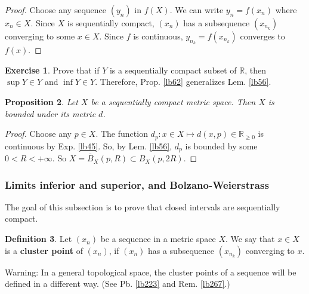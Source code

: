 \documentclass[12pt,b5paper,notitlepage]{article}
\theoremstyle{definition}
\newtheorem{df}{Definition}[section]
\newtheorem{exe}[df]{Exercise}
\theoremstyle{plain}
\newtheorem{pp}[df]{Proposition}
\newcommand{\ovl}{\overline}
\newcommand{\Rbb}{\mathbb R}
\numberwithin{equation}{section}
\begin{document}
\begin{proof}
Choose any sequence $(y_n)$ in $f(X)$. We can write $y_n=f(x_n)$ where $x_n\in X$. Since $X$ is sequentially compact, $(x_n)$ has a subsequence $(x_{n_k})$ converging to some $x\in X$. Since $f$ is continuous, $y_{n_k}=f(x_{n_k})$ converges to $f(x)$.
\end{proof}


\begin{exe}\label{lb63}
Prove that if $Y$ is a sequentially compact subset of $\Rbb$, then $\sup Y\in Y$ and $\inf Y\in Y$. Therefore, Prop. \ref{lb62} generalizes Lem. \ref{lb56}.
\end{exe}

\begin{pp}\label{lb71}
Let $X$ be a sequentially compact metric space. Then $X$ is bounded under its metric $d$.
\end{pp}

\begin{proof}
Choose any $p\in X$. The function $d_p:x\in X\mapsto d(x,p)\in\Rbb_{\geq 0}$ is continuous by Exp. \ref{lb45}. So, by Lem. \ref{lb56}, $d_p$ is bounded by some $0<R<+\infty$. So $X=\ovl B_X(p,R)\subset B_X(p,2R)$.
\end{proof} 






\subsubsection{Limits inferior and superior, and Bolzano-Weierstrass}\label{lb69}

The goal of this subsection is to prove that closed intervals are sequentially compact. 


\begin{df}\label{lb266}
Let $(x_n)$ be a sequence in a metric space $X$. We say that $x\in X$ is a \textbf{cluster point}  of $(x_n)$, if $(x_n)$ has a subsequence $(x_{n_k})$ converging to $x$.
\end{df}

Warning: In a general topological space, the cluster points of a sequence will be defined in a different way. (See Pb. \ref{lb223} and Rem. \ref{lb267}.)
\end{document}
